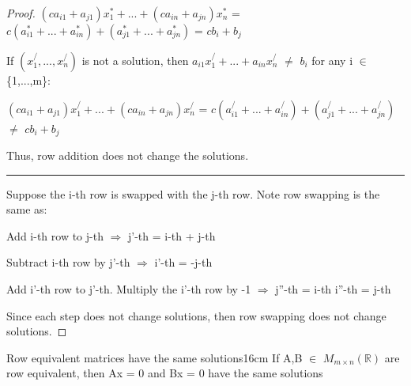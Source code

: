 \begin{proof}
        \hspace{1cm}
        $(ca_{i1}+a_{j1})x_1^* + ... + (ca_{in}+a_{jn})x_n^*$
        = $c(a_{i1}^* + ... + a_{in}^*) + (a_{j1}^* + ... + a_{jn}^*)$
        = $cb_i + b_j$
        
        \hspace{0.5cm}
        If $(x_1^/,...,x_n^/)$ is not a solution,
        then $a_{i1}x_1^/ + ... + a_{in}x_n^/$ $\not =$ $b_i$
        for any i $\in$ \{1,...,m\}:
        
        \hspace{1cm}
        $(ca_{i1}+a_{j1})x_1^/ + ... + (ca_{in}+a_{jn})x_n^/$
        = $c(a_{i1}^/ + ... + a_{in}^/) + (a_{j1}^/ + ... + a_{jn}^/)$
        $\not =$ $cb_i + b_j$

        Thus, row addition does not change the solutions.

        \rule[0.1cm]{16.7cm}{0.01cm}

        Suppose the i-th row is swapped with the j-th row.
        Note row swapping is the same as:

        \hspace{0.5cm}
        Add i-th row to j-th
        \hspace{0.5cm}
        $\Rightarrow$
        \hspace{0.5cm}
        j'-th = i-th + j-th

        \hspace{0.5cm}
        Subtract i-th row by j'-th
        \hspace{0.5cm}
        $\Rightarrow$
        \hspace{0.5cm}
        i'-th = -j-th

        \hspace{0.5cm}
        Add i'-th row to j'-th.
        Multiply the i'-th row by -1
        \hspace{0.5cm}
        $\Rightarrow$
        \hspace{0.5cm}
        j''-th = i-th
        \hspace{0.5cm}
        i''-th = j-th

        Since each step does not change solutions,
        then row swapping does not change solutions.
    \end{proof}

    \vspace{0.5cm}



    \begin{wtheorem}{Row equivalent matrices have the same solutions}{16cm}
        If A,B $\in$ $M_{m \times n}(\mathbb{R})$
        are row equivalent, then Ax = 0 and Bx = 0
        have the same solutions
    \end{wtheorem}

